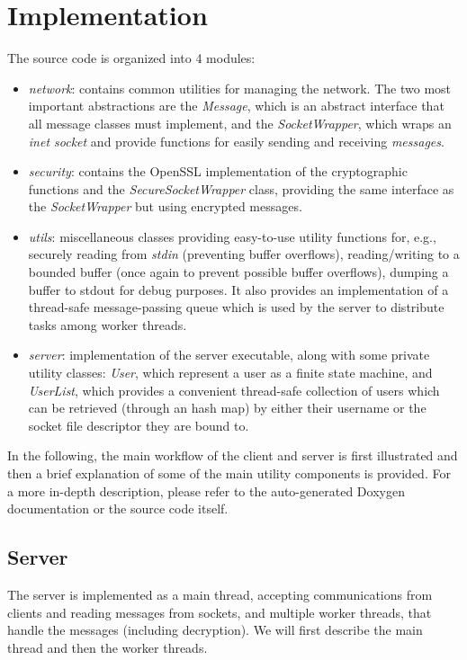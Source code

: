 \section{Implementation}

The source code is organized into 4 modules:
\begin{itemize}
    \item \emph{network}: contains common utilities for managing the network. 
        The two most important abstractions are the \emph{Message}, which 
        is an abstract interface that all message classes must implement, and 
        the \emph{SocketWrapper}, which wraps an \emph{inet socket} and 
        provide functions for easily sending and receiving \emph{messages}.
    \item \emph{security}: contains the OpenSSL implementation of the 
        cryptographic functions and the \emph{SecureSocketWrapper} class,
        providing the same interface as the \emph{SocketWrapper} but using 
        encrypted messages.
    \item \emph{utils}: miscellaneous classes providing easy-to-use utility 
        functions for, e.g., securely reading from \emph{stdin} (preventing 
        buffer overflows), reading/writing to a bounded buffer (once again 
        to prevent possible buffer overflows), dumping a buffer to stdout 
        for debug purposes. It also provides an implementation of a thread-safe
        message-passing queue which is used by the server to distribute tasks
        among worker threads.
    \item \emph{server}: implementation of the server executable, along with
        some private utility classes: \emph{User}, which represent a user as 
        a finite state machine, and \emph{UserList}, which provides a convenient
        thread-safe collection of users which can be retrieved (through an
        hash map) by either their username or the socket file descriptor they 
        are bound to.
\end{itemize}

In the following, the main workflow of the client and server is first
illustrated and then a brief explanation of some of the main utility components 
is provided. For a more in-depth description, please refer to the auto-generated 
Doxygen documentation or the source code itself.

\subsection{Server}
The server is implemented as a main thread, accepting communications from 
clients and reading messages from sockets, and multiple worker threads, that 
handle the messages (including decryption). We will first describe the main 
thread and then the worker threads.

